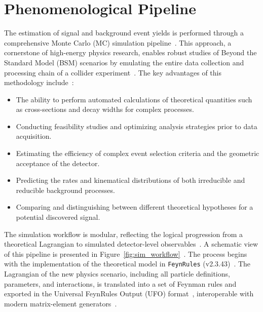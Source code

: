 \section{Phenomenological Pipeline}

The estimation of signal and background event yields is performed through a comprehensive Monte Carlo (MC) simulation pipeline~\cite{Christensen:2008py,Alloul:2013bka,Degrande:2011ua,Alwall:2014hca}. This approach, a cornerstone of high-energy physics research, enables robust studies of Beyond the Standard Model (BSM) scenarios by emulating the entire data collection and processing chain of a collider experiment~\cite{Sjostrand:2014zea,deFavereau:2013fsa}. The key advantages of this methodology include~\cite{Alwall:2014hca,Cacciari:2011ma}:

\begin{itemize}
    \item The ability to perform automated calculations of theoretical quantities such as cross-sections and decay widths for complex processes.
    \item Conducting feasibility studies and optimizing analysis strategies prior to data acquisition.
    \item Estimating the efficiency of complex event selection criteria and the geometric acceptance of the detector.
    \item Predicting the rates and kinematical distributions of both irreducible and reducible background processes.
    \item Comparing and distinguishing between different theoretical hypotheses for a potential discovered signal.
\end{itemize}

The simulation workflow is modular, reflecting the logical progression from a theoretical Lagrangian to simulated detector-level observables~\cite{Christensen:2008py,Alloul:2013bka,Degrande:2011ua,Alwall:2014hca}. A schematic view of this pipeline is presented in Figure~\ref{fig:sim_workflow}~\cite{Alwall:2014hca,deFavereau:2013fsa}. The process begins with the implementation of the theoretical model in \texttt{FeynRules} (v2.3.43)~\parencite{Christensen:2008py,Alloul:2013bka}. The Lagrangian of the new physics scenario, including all particle definitions, parameters, and interactions, is translated into a set of Feynman rules and exported in the Universal FeynRules Output (UFO) format~\cite{Degrande:2011ua}, interoperable with modern matrix-element generators~\cite{Alwall:2014hca}.

